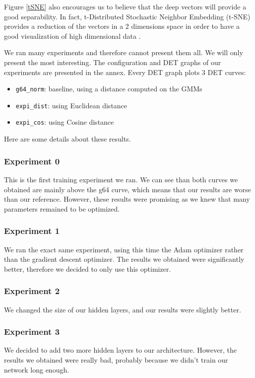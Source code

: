 \documentclass[conference]{IEEEtran}
\begin{document}
Figure \ref{tSNE} also encourages us to believe that the deep vectors will provide a good separability. In fact, t-Distributed Stochastic Neighbor Embedding (t-SNE) provides a reduction of the vectors in a 2 dimensions space in order to have a good visualization of high dimensional data \cite{ictdbid:2777}.

We ran many experiments and therefore cannot present them all. We will only present the most interesting. The configuration and DET graphs of our experiments are presented in the annex. Every DET graph plots 3 DET curves:
\begin{itemize}
\item \texttt{g64\_norm}: baseline, using a distance computed on the GMMs
\item \texttt{expi\_dist}: using Euclidean distance
\item \texttt{expi\_cos}: using Cosine distance
\end{itemize}
Here are some details about these results.

\subsubsection{Experiment 0} This is the first training experiment we ran. We can see than both curves we obtained are mainly above the g64 curve, which means that our results are worse than our reference. However, these results were promising as we knew that many parameters remained to be optimized.

\subsubsection{Experiment 1} We ran the exact same experiment, using this time the Adam optimizer rather than the gradient descent optimizer. The results we obtained were significantly better, therefore we decided to only use this optimizer.

\subsubsection{Experiment 2} We changed the size of our hidden layers, and our results were slightly better.

\subsubsection{Experiment 3} We decided to add two more hidden layers to our architecture. However, the results we obtained were really bad, probably because we didn't train our network long enough.
\end{document}
